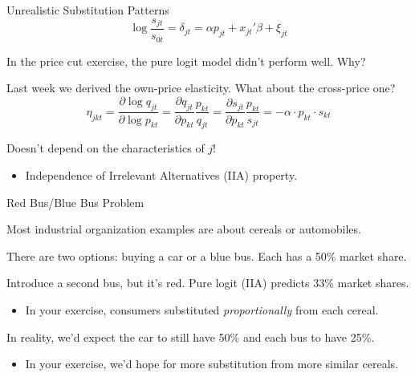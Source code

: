\documentclass[aspectratio=169,t,11pt,table]{beamer}
\begin{document}
\begin{frame}{Unrealistic Substitution Patterns}
    \vspace{-\baselineskip}
    \begin{equation*}
        \log\frac{s_{jt}}{s_{0t}} = \delta_{jt} = \alpha p_{jt} + x_{jt}'\beta + \xi_{jt}
    \end{equation*}
    \vspace{-0.5\baselineskip}
    \begin{wideitemize}
        \item In the price cut exercise, the pure logit model didn't perform well. Why?
        \pause
        \item Last week we derived the own-price elasticity. What about the cross-price one?
        \begin{equation*}
            \eta_{jkt} = \frac{\partial\log q_{jt}}{\partial\log p_{kt}} = \frac{\partial q_{jt}}{\partial p_{kt}} \frac{p_{kt}}{q_{jt}} = \frac{\partial s_{jt}}{\partial p_{kt}} \frac{p_{kt}}{s_{jt}} = -\alpha \cdot p_{kt} \cdot s_{kt}
        \end{equation*}
        \vspace{-\baselineskip}
        \pause
        \item Doesn't depend on the characteristics of $j$!
        \begin{itemize}
            \item Independence of Irrelevant Alternatives (IIA) property.
        \end{itemize}
    \end{wideitemize}
\end{frame}

\begin{frame}{Red Bus/Blue Bus Problem}
    \begin{wideitemize}
        \item Most industrial organization examples are about cereals or automobiles.
        \pause
        \item There are two options: buying a car or a blue bus. Each has a 50\% market share.
        \pause
        \item Introduce a second bus, but it's red. Pure logit (IIA) predicts 33\% market shares.
        \begin{itemize}
            \item In your exercise, consumers substituted \textit{proportionally} from each cereal.
        \end{itemize}
        \pause
        \item In reality, we'd expect the car to still have 50\% and each bus to have 25\%.
        \begin{itemize}
            \item In your exercise, we'd hope for more substitution from more similar cereals.
        \end{itemize}
    \end{wideitemize}
\end{frame}
\end{document}
